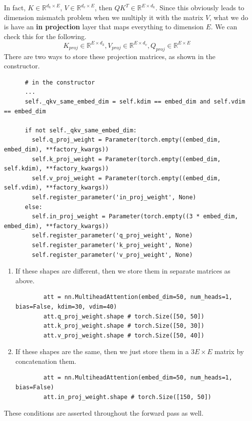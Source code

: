     In fact, $K \in \mathbb{R}^{d_k \times E}$, $V \in \mathbb{R}^{d_v \times E}$, then $QK^T \in \mathbb{R}^{E \times d_k}$. Since this obviously leads to dimension mismatch problem when we multiply it with the matrix $V$, what we do is have an \textbf{in projection} layer that maps everything to dimension $E$. We can check this for the following. 
    \begin{equation}
      K_{proj} \in \mathbb{R}^{E \times d_k}, V_{proj} \in \mathbb{R}^{E \times d_v}, Q_{proj} \in \mathbb{R}^{E \times E}
    \end{equation}
    There are two ways to store these projection matrices, as shown in the constructor. 
    \begin{lstlisting}
      # in the constructor 
      ...
      self._qkv_same_embed_dim = self.kdim == embed_dim and self.vdim == embed_dim

      if not self._qkv_same_embed_dim:
        self.q_proj_weight = Parameter(torch.empty((embed_dim, embed_dim), **factory_kwargs))
        self.k_proj_weight = Parameter(torch.empty((embed_dim, self.kdim), **factory_kwargs))
        self.v_proj_weight = Parameter(torch.empty((embed_dim, self.vdim), **factory_kwargs))
        self.register_parameter('in_proj_weight', None)
      else:
        self.in_proj_weight = Parameter(torch.empty((3 * embed_dim, embed_dim), **factory_kwargs))
        self.register_parameter('q_proj_weight', None)
        self.register_parameter('k_proj_weight', None)
        self.register_parameter('v_proj_weight', None)
    \end{lstlisting}
    \begin{enumerate}
      \item If these shapes are different, then we store them in separate matrices as above. 
      \begin{lstlisting}
        att = nn.MultiheadAttention(embed_dim=50, num_heads=1, bias=False, kdim=30, vdim=40) 
        att.q_proj_weight.shape # torch.Size([50, 50])
        att.k_proj_weight.shape # torch.Size([50, 30])
        att.v_proj_weight.shape # torch.Size([50, 40])
      \end{lstlisting}

      \item If these shapes are the same, then we just store them in a $3E \times E$ matrix by concatenation them. 
      \begin{lstlisting}
        att = nn.MultiheadAttention(embed_dim=50, num_heads=1, bias=False) 
        att.in_proj_weight.shape # torch.Size([150, 50])
      \end{lstlisting}
    \end{enumerate}
    These conditions are asserted throughout the forward pass as well.  

